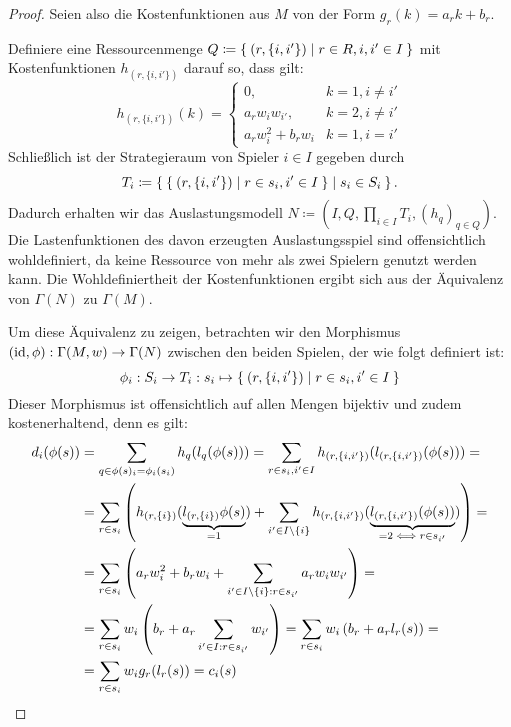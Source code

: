 \begin{proof}
	Seien also die Kostenfunktionen aus $M$ von der Form $g_r(k) = a_r k + b_r$.
	
	Definiere eine Ressourcenmenge $Q \coloneqq \Set{(r, \{i, i'\}) | r \in R, i,i' \in I}$ mit Kostenfunktionen $h_{(r, \{i,i'\})}$ darauf so, dass gilt:
		\[h_{(r, \{i,i'\})} (k) = \begin{cases}
									0, 					& k=1, i \neq i' \\
									a_r w_i w_{i'}, 	& k=2, i \neq i' \\
									a_r w_i^2 + b_r w_i	& k=1, i = i'
								\end{cases} \]
	Schließlich ist der Strategieraum von Spieler $i \in I$ gegeben durch
		\[T_i \coloneqq \Set{\Set{(r, \{i, i'\}) | r \in s_i, i' \in I} | s_i \in S_i }.\]
	Dadurch erhalten wir das Auslastungsmodell $N \coloneqq (I, Q, \prod_{i \in I} T_i, (h_q)_{q \in Q})$. Die Lastenfunktionen des davon erzeugten Auslastungsspiel sind offensichtlich wohldefiniert, da keine Ressource von mehr als zwei Spielern genutzt werden kann. Die Wohldefiniertheit der Kostenfunktionen ergibt sich aus der Äquivalenz von $\Gamma(N)$ zu $\Gamma(M)$.
	
	Um diese Äquivalenz zu zeigen, betrachten wir den Morphismus $(\mathrm{id}, \phi): \Gamma(M,w) \to \Gamma(N)$ zwischen den beiden Spielen, der wie folgt definiert ist:
	\[\phi_i: S_i \to T_i: s_i \mapsto \Set{(r, \{i, i'\}) | r \in s_i, i' \in I}\]
	Dieser Morphismus ist offensichtlich auf allen Mengen bijektiv und zudem kostenerhaltend, denn es gilt:
	\begin{align*}
	d_i(\phi(s)) 	&= \sum_{q \in \phi(s)_i = \phi_i(s_i)} h_q(l_q(\phi(s))) = \sum_{r \in s_i, i' \in I} h_{(r, \{i,i'\})}(l_{(r, \{i,i'\})}(\phi(s))) = \\
	&= \sum_{r \in s_i} \left(h_{(r, \{i\})}(\underbrace{l_{(r, \{i\})}\phi(s)}_{=1}) + \sum_{i' \in I\setminus\{i\}} h_{(r, \{i, i'\})}(\underbrace{l_{(r, \{i, i'\})}(\phi(s))}_{=2 \iff r \in s_{i'}})\right) = \\
	&= \sum_{r \in s_i}\left( a_r w_i^2 + b_r w_i + \sum_{i' \in I\setminus\{i\}: r \in s_{i'}} a_r w_i w_{i'}\right) = \\
	&= \sum_{r \in s_i}w_i \left( b_r + a_r \sum_{i' \in I: r \in s_{i'}}w_{i'} \right) = \sum_{r \in s_i}w_i \left( b_r + a_r l_r(s)\right) = \\
	&= \sum_{r \in s_i}w_i g_r(l_r(s)) = c_i(s) \qedhere
	\end{align*}
\end{proof}

